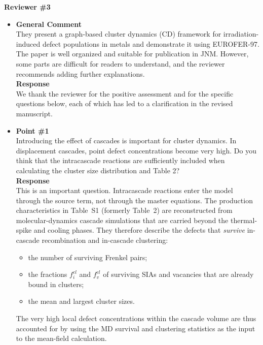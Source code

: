 \documentclass{article}
\begin{document}
\newpage
\noindent\textbf{Reviewer \#3}
\begin{itemize}
\item \textbf{General Comment}\\
They present a graph-based cluster dynamics (CD) framework for irradiation-induced defect populations in metals and demonstrate it using EUROFER-97. The paper is well organized and suitable for publication in JNM. However, some parts are difficult for readers to understand, and the reviewer recommends adding further explanations.\\

\textbf{Response}\\
We thank the reviewer for the positive assessment and for the specific questions below, each of which has led to a clarification in the revised manuscript.

\item \textbf{Point \#1}\\
Introducing the effect of cascades is important for cluster dynamics. In displacement cascades, point defect concentrations become very high. Do you think that the intracascade reactions are sufficiently included when calculating the cluster size distribution and Table 2?\\

\textbf{Response}\\
This is an important question. Intracascade reactions enter the model through the source term, not through the master equations. The production characteristics in Table~S1 (formerly Table~2) are reconstructed from molecular-dynamics cascade simulations that are carried beyond the thermal-spike and cooling phases. They therefore describe the defects that \emph{survive} in-cascade recombination and in-cascade clustering:
\begin{itemize}
    \item the number of surviving Frenkel pairs;
    \item the fractions $f_i^{cl}$ and $f_v^{cl}$ of surviving SIAs and vacancies that are already bound in clusters;
    \item the mean and largest cluster sizes.
\end{itemize}
The very high local defect concentrations within the cascade volume are thus accounted for by using the MD survival and clustering statistics as the input to the mean-field calculation.


\end{itemize}
\end{document}
